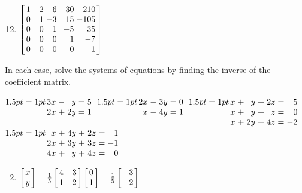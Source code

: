 \begin{multicols}{2}
\begin{ex}
\begin{sol}
\begin{enumerate}[label={\alph*.}]
\setcounter{enumi}{11}
\item $\leftB \begin{array}{rrrrr}
1 & -2 & 6 & -30 & 210 \\
0 & 1 & -3 & 15 & -105 \\
0 & 0 & 1 & -5 & 35 \\
0 & 0 & 0 & 1 & -7 \\
0 & 0 & 0 & 0 & 1
\end{array} \rightB$

\end{enumerate}
\end{sol}
\end{ex}

\begin{ex}
In each case, solve the systems of equations by finding the inverse of the coefficient matrix.
\begin{exenumerate}
\exitem $\arraycolsep=1pt\begin{array}[t]{rrrrr}
3x & - & y & = & 5 \\
2x & + & 2y & = & 1
\end{array}$
\exitem $\arraycolsep=1pt\begin{array}[t]{rrrrr}
2x & - & 3y & = & 0 \\
x & - & 4y & = & 1
\end{array}$
\exitem $\arraycolsep=1pt\begin{array}[t]{rrrrrrr}
x & + & y & + & 2z & = & 5 \\
x & + & y & + & z & = & 0 \\
x & + & 2y & + & 4z & = & -2
\end{array}$
\exitem $\arraycolsep=1pt\begin{array}[t]{rrrrrrr}
x & + & 4y & + & 2z & = & 1 \\
2x & + & 3y & + & 3z & = & -1 \\
4x & + & y & + & 4z & = & 0
\end{array}$
\end{exenumerate}
\begin{sol}
\begin{enumerate}[label={\alph*.}]
\setcounter{enumi}{1}
\item $\leftB \begin{array}{c}
x \\
y
\end{array} \rightB = \frac{1}{5} \leftB \begin{array}{rr}
4 & -3 \\
1 & -2
\end{array} \rightB \leftB \begin{array}{r}
0 \\
1
\end{array} \rightB = \frac{1}{5} \leftB \begin{array}{r}
-3 \\
-2
\end{array} \rightB$


\end{enumerate}
\end{sol}
\end{ex}
\end{multicols}
